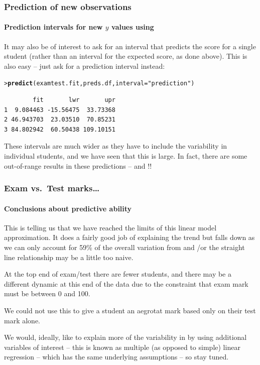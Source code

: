 \documentclass{beamer}\usepackage[]{graphicx}\usepackage[]{xcolor}
\makeatletter
\newcommand{\hlstr}[1]{\textcolor[rgb]{0.192,0.494,0.8}{#1}}%
\newcommand{\hlstd}[1]{\textcolor[rgb]{0.345,0.345,0.345}{#1}}%
\newcommand{\hlkwc}[1]{\textcolor[rgb]{0.333,0.667,0.333}{#1}}%
\newcommand{\hlkwd}[1]{\textcolor[rgb]{0.737,0.353,0.396}{\textbf{#1}}}%
\newenvironment{kframe}{%
 \def\at@end@of@kframe{}%
 \ifinner\ifhmode%
  \def\at@end@of@kframe{\end{minipage}}%
  \begin{minipage}{\columnwidth}%
 \fi\fi%
 \def\FrameCommand##1{\hskip\@totalleftmargin \hskip-\fboxsep
 \colorbox{shadecolor}{##1}\hskip-\fboxsep
     \hskip-\linewidth \hskip-\@totalleftmargin \hskip\columnwidth}%
 \MakeFramed {\advance\hsize-\width
   \@totalleftmargin\z@ \linewidth\hsize
   \@setminipage}}%
 {\par\unskip\endMakeFramed%
 \at@end@of@kframe}
\newenvironment{knitrout}{}{} %
\makeatother
\begin{document}
\begin{frame}[fragile]
\frametitle{Prediction of new observations}
\framesubtitle{Prediction intervals for new $y$ values using }

It may also be of interest to ask for an interval that predicts the  score
for a single student (rather than an interval for the expected score, as done above).
This is also easy -- just ask for a prediction interval instead:

\begin{knitrout}\scriptsize
{}\color{fgcolor}\begin{kframe}
\begin{alltt}
\hlstd{> }\hlkwd{predict}\hlstd{(examtest.fit, preds.df,} \hlkwc{interval}\hlstd{=}\hlstr{"prediction"}\hlstd{)}
\end{alltt}
\begin{verbatim}
        fit       lwr       upr
1  9.084463 -15.56475  33.73368
2 46.943703  23.03510  70.85231
3 84.802942  60.50438 109.10151
\end{verbatim}
\end{kframe}
\end{knitrout}

 
These intervals are much wider as they have to include the variability in individual
students, and we have seen that this is large.
In fact, there are some out-of-range results in these predictions --  and !!

\end{frame}


\begin{frame}[fragile]
\frametitle{Exam vs.\ Test marks\ldots}
\framesubtitle{Conclusions about predictive ability}

This is telling us that we have reached the limits of this linear model approximation. It does a fairly good job of explaining the trend but falls down as we can only account for 59\% of the overall variation from  and 
/or the straight line relationship may be a little too naive.

At the top end of exam/test there are fewer students, and there may be a different dynamic at this end of the data due to the constraint that exam mark must be between 0 and 100.

We could not use this to give a student an aegrotat mark based only on their test mark alone.

We would, ideally, like to explain more of the variability in  by using additional variables of interest -- this is known as multiple (as opposed to simple) linear regression -- which has the same underlying assumptions -- so stay tuned.  

\end{frame}
\end{document}
